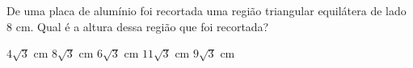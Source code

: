\noindent\parbox{\linewidth}{

De uma placa de alumínio foi recortada uma região triangular equilátera de lado $8$ cm. Qual é a altura dessa região que foi recortada?

$4\sqrt{3}$ cm
$8\sqrt{3}$ cm
$6\sqrt{3}$ cm
$11\sqrt{3}$ cm
$9\sqrt{3}$ cm



}


